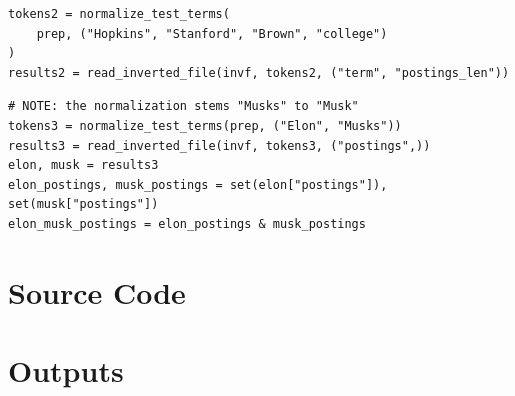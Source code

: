 \documentclass[11pt]{article}
\begin{document}
\begin{lstlisting}[style=mypython,caption=Test 2: Document frequency for the words: "Hopkins"\, "Stanford"\, "Brown"\, and "college"]
tokens2 = normalize_test_terms(
    prep, ("Hopkins", "Stanford", "Brown", "college")
)
results2 = read_inverted_file(invf, tokens2, ("term", "postings_len"))
\end{lstlisting}


\begin{lstlisting}[style=mypython,caption=Test 3: docids for documents that have both "Elon" and "Musk"]
# NOTE: the normalization stems "Musks" to "Musk"
tokens3 = normalize_test_terms(prep, ("Elon", "Musks"))
results3 = read_inverted_file(invf, tokens3, ("postings",))
elon, musk = results3
elon_postings, musk_postings = set(elon["postings"]), set(musk["postings"])
elon_musk_postings = elon_postings & musk_postings
\end{lstlisting}


\appendix

\section{Source Code} \label{appendix:src}



\section{Outputs} \label{appendix:outputs}


\end{document}
